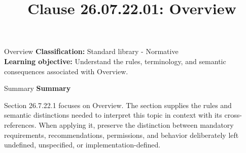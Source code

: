 \documentclass[10pt,letterpaper]{article}
\title{Clause 26.07.22.01: Overview}
\author{}
\date{}
\begin{document}
\maketitle
\begin{CornellOverviewBox}{Overview}
\textbf{Classification:} Standard library - Normative\\[2pt]
\textbf{Learning objective:} Understand the rules, terminology, and semantic consequences associated with Overview.
\end{CornellOverviewBox}\begin{CornellSummaryBox}{Summary}
{\sffamily\bfseries\color{Accent} Summary}\par\vspace{3pt}Section 26.7.22.1 focuses on Overview. The section supplies the rules and semantic distinctions needed to interpret this topic in context with its cross-references. When applying it, preserve the distinction between mandatory requirements, recommendations, permissions, and behavior deliberately left undefined, unspecified, or implementation-defined.
\end{CornellSummaryBox}
\end{document}

